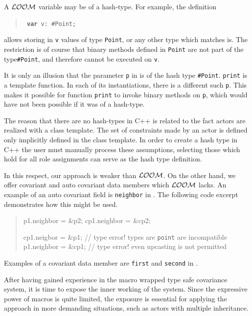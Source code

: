 \documentclass[11pt]{article}
\numberwithin{figure}{section}
\newcommand\CC{\Lang{\mbox{C++}}\xspace}
\newcommand\Lang[1]{\textsc{#1}}
\newcommand{\cd}[1]{\texttt{#1}}
\newcommand{\LOOM}{\ensuremath{\cal{LOOM}}\xspace}
\newenvironment{excerpt}{\begin{quote}\begin{minipage}\textwidth}{\end{minipage}\end{quote}}
\begin{document}
A \LOOM variable may be of a hash-type.
For example, the definition
\begin{quote}
\tt
\textbf\texttt{var} v: \#Point;
\end{quote}
allows storing in \cd{v} values
    of type \cd{Point},
    or any other type which matches is.
The restriction is of course that
    binary methods defined in \cd{Point}
    are not part of the type\cd{\#Point},
    and therefore cannot be executed on \cd{v}.

It is only an illusion that the
    parameter \cd{p} in
     is of the hash type \cd{\#Point}.
\cd{print} is a template function.
In each of its instantiations, there
    is a different such \cd{p}.
This makes it possible for
    function \cd{print} to invoke binary methods
    on \cd{p}, which would have not been possible if it was of a hash-type.

The reason that there are no hash-types in \CC{} is
    related to the fact actors are realized with a class template.
The set of constraints made by an actor is
    defined only implicitly defined in the class template.
In order to create a hash type in \CC the user must
    manually process these assumptions, selecting
    those which hold for all role assignments can serve
    as the hash type definition.

In this respect, our approach is weaker than \LOOM.
On the other hand, we offer covariant and auto covariant data members
    which \LOOM lacks.
An example of an auto covariant field is \cd{neighbor} in
    .
The following code excerpt demonstrates how this might be used.
\begin{excerpt}
\CPP
    p1.neighbor = &p2;
    cp1.neighbor = &cp2;

    cp1.neigbor = &p1;       //{} type error! types are \cd{point} are incompatible
    p1.neighbor = &cp1;     //{} type error! even upcasting is not permitted
\END\PROGbg{}
\end{excerpt}
Examples of a covariant data member are \cd{first} and
    \cd{second} in .

After having gained experience in the macro wrapped type
    safe covariance system, it is time to expose the
    inner working of the system.
Since the expressive power of macros is quite limited,
    the exposure is essential for applying the approach
    in more demanding situations, such as actors with multiple
    inheritance.
\end{document}
